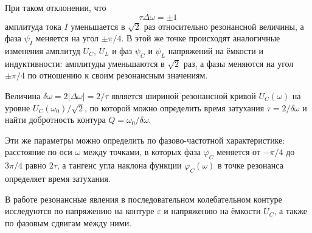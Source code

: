 При таком отклонении, что
\[
    \tau \Delta \omega = \pm 1
\]
амплитуда тока $I$ уменьшается в $\sqrt{2}$ раз относительно резонансной величины, а фаза $ \psi_{I}$ меняется на угол $\pm \pi /4$. В этой же точке происходят аналогичные изменения амплитуд $U_{C}$, $U_{L}$ и фаз
$ \psi_{C}$ и $ \psi_{L}$ напряжений на  ёмкости и индуктивности: амплитуды уменьшаются в $\sqrt{2}$ раз, а фазы меняются на угол $\pm \pi /4$ по отношению к своим резонансным значениям.

Величина $ \delta \omega  = 2 | \Delta  \omega | = 2 / \tau $ является шириной резонансной кривой $U_{C}( \omega )$ на уровне $U_{C}( \omega_{0})/\sqrt{2}$, по которой можно определить время затухания $ \tau  = 2 / \delta \omega $
и найти добротность контура $Q = \omega_{0} / \delta \omega $.

Эти же параметры можно определить по фазово-частотной характеристике: расстояние по оси $ \omega $ между точками, в которых фаза $ \varphi_{C}$ меняется от $- \pi /4$ до $3 \pi / 4$ равно $2 \tau $,
а тангенс угла наклона функции $ \varphi_{C}( \omega)$ в точке резонанса определяет время затухания.

В работе резонансные явления в последовательном колебательном контуре исследуются по напряжению на контуре $ \varepsilon $ и напряжению на ёмкости $U_{C}$, а также по фазовым сдвигам между ними.
